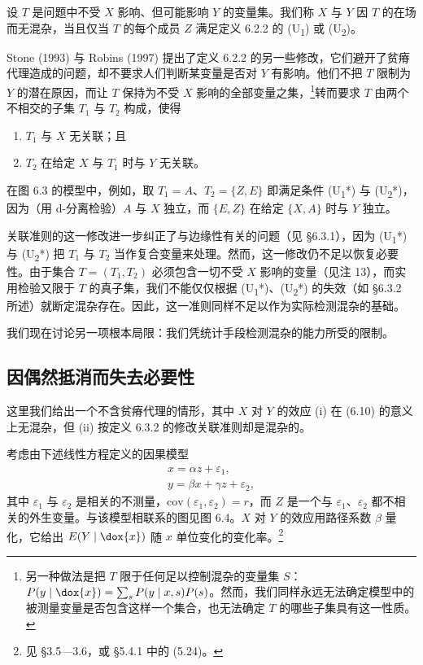 \begin{definition}
设 $T$ 是问题中不受 $X$ 影响、但可能影响 $Y$ 的变量集。我们称 $X$ 与 $Y$ 因 $T$ 的在场而无混杂，当且仅当 $T$ 的每个成员 $Z$ 满足定义 6.2.2 的 (U\textsubscript{1}) 或 (U\textsubscript{2})。
\end{definition}

Stone (1993) 与 Robins (1997) 提出了定义 6.2.2 的另一些修改，它们避开了贫瘠代理造成的问题，却不要求人们判断某变量是否对 $Y$ 有影响。他们不把 $T$ 限制为 $Y$ 的潜在原因，而让 $T$ 保持为不受 $X$ 影响的全部变量之集，\footnote{另一种做法是把 $T$ 限于任何足以控制混杂的变量集 $S$：$P(y\mid \dox{x})=\sum_s P(y\mid x,s)P(s)$。然而，我们同样永远无法确定模型中的被测量变量是否包含这样一个集合，也无法确定 $T$ 的哪些子集具有这一性质。}转而要求 $T$ 由两个不相交的子集 $T_1$ 与 $T_2$ 构成，使得
\begin{enumerate}[label=(\textup{U}\textsubscript{\arabic*}*),leftmargin=3.4em]
\item $T_1$ 与 $X$ 无关联；且
\item $T_2$ 在给定 $X$ 与 $T_1$ 时与 $Y$ 无关联。
\end{enumerate}

在图 6.3 的模型中，例如，取 $T_1=A$、$T_2=\{Z,E\}$ 即满足条件 (U\textsubscript{1}*) 与 (U\textsubscript{2}*)，因为（用 d-分离检验）$A$ 与 $X$ 独立，而 $\{E,Z\}$ 在给定 $\{X,A\}$ 时与 $Y$ 独立。

关联准则的这一修改进一步纠正了与边缘性有关的问题（见 \S 6.3.1），因为 (U\textsubscript{1}*) 与 (U\textsubscript{2}*) 把 $T_1$ 与 $T_2$ 当作复合变量来处理。然而，这一修改仍不足以恢复必要性。由于集合 $T=(T_1,T_2)$ 必须包含一切不受 $X$ 影响的变量（见注 13），而实用检验又限于 $T$ 的真子集，我们不能仅仅根据 (U\textsubscript{1}*)、(U\textsubscript{2}*) 的失效（如 \S 6.3.2 所述）就断定混杂存在。因此，这一准则同样不足以作为实际检测混杂的基础。

我们现在讨论另一项根本局限：我们凭统计手段检测混杂的能力所受的限制。

\subsection{因偶然抵消而失去必要性}

这里我们给出一个不含贫瘠代理的情形，其中 $X$ 对 $Y$ 的效应 (i) 在 \textup{(6.10)} 的意义上无混杂，但 (ii) 按定义 6.3.2 的修改关联准则却是混杂的。

\begin{example}
考虑由下述线性方程定义的因果模型
\begin{gather}
x = \alpha z + \varepsilon_1, \tag{6.11}\\
y = \beta x + \gamma z + \varepsilon_2, \tag{6.12}
\end{gather}
其中 $\varepsilon_1$ 与 $\varepsilon_2$ 是相关的不测量，$\mathrm{cov}(\varepsilon_1,\varepsilon_2)=r$，而 $Z$ 是一个与 $\varepsilon_1$、$\varepsilon_2$ 都不相关的外生变量。与该模型相联系的图见图 6.4。$X$ 对 $Y$ 的效应用路径系数 $\beta$ 量化，它给出 $E(Y\mid \dox{x})$ 随 $x$ 单位变化的变化率。\footnote{见 \S 3.5—3.6，或 \S 5.4.1 中的 \textup{(5.24)}。}
\end{example}

